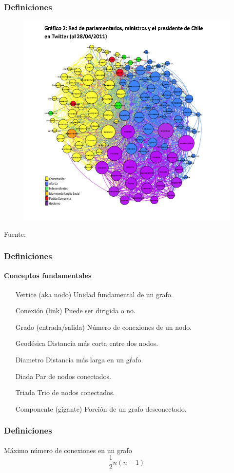 \documentclass{beamer}
\begin{document}
\begin{frame}
\frametitle{Definiciones}

\begin{figure}
\centering
\includegraphics[width=.8\linewidth]{../media/red_parlamentarios_ministros_en_twitter}
\end{figure}
{\footnotesize Fuente: \cite{fabrega2011}}

\end{frame}

\begin{frame}
\frametitle{Definiciones}
\framesubtitle{Conceptos fundamentales}

\begin{itemize}
\item[Vertice] (aka nodo) Unidad fundamental de un grafo.
\item[Conexi\'on] (link) Puede ser dirigida o no.
\item[Grado] (entrada/salida) N\'umero de conexiones de un nodo.
\item[Geod\'esica] Distancia m\'as corta entre dos nodos.
\item[Diametro] Distancia m\'as larga en un g\'rafo. 
\item[Diada] Par de nodos conectados.
\item[Triada] Trio de nodos conectados.
\item[Componente] (gigante) Porci\'on de un grafo desconectado.
\end{itemize}
\end{frame}

\begin{frame}
\frametitle{Definiciones}
\framesubtitle{}

M\'aximo n\'umero de conexiones en un grafo
\begin{equation}
\frac{1}{2}n(n-1)
\end{equation}
\end{frame}
\end{document}
